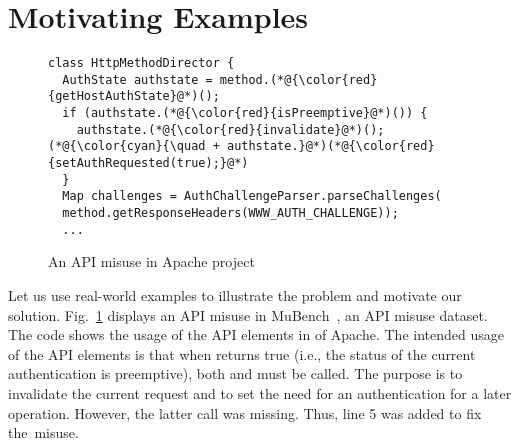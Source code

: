 \section{Motivating Examples}
\label{sec:motiv}

\begin{figure}[t]
	\centering
\begin{lstlisting}[]
class HttpMethodDirector {
  AuthState authstate = method.(*@{\color{red}{getHostAuthState}@*)();
  if (authstate.(*@{\color{red}{isPreemptive}@*)()) {
    authstate.(*@{\color{red}{invalidate}@*)();
(*@{\color{cyan}{\quad + authstate.}@*)(*@{\color{red}{setAuthRequested(true);}@*)
  }
  Map challenges = AuthChallengeParser.parseChallenges(
  method.getResponseHeaders(WWW_AUTH_CHALLENGE));
  ...
\end{lstlisting}
        \vspace{-12pt}
        \caption{An API misuse in Apache  project}
        \vspace{-6pt}
        \label{fig:example1}
\end{figure}

Let us use real-world examples to illustrate the problem and motivate
our solution. Fig.~\ref{fig:example1} displays an API misuse in
MuBench~\cite{mudetect-msr19}, an API misuse dataset. The code shows
the usage of the API elements in  of Apache.  The
intended usage of the API elements is that when
 returns true (i.e., the
status of the current authentication is preemptive), both
 and
 must be called. The
purpose is to invalidate the current request and to set the need for
an authentication for a later operation. However, the latter call was
missing. Thus, line 5 was added to fix the~misuse.

